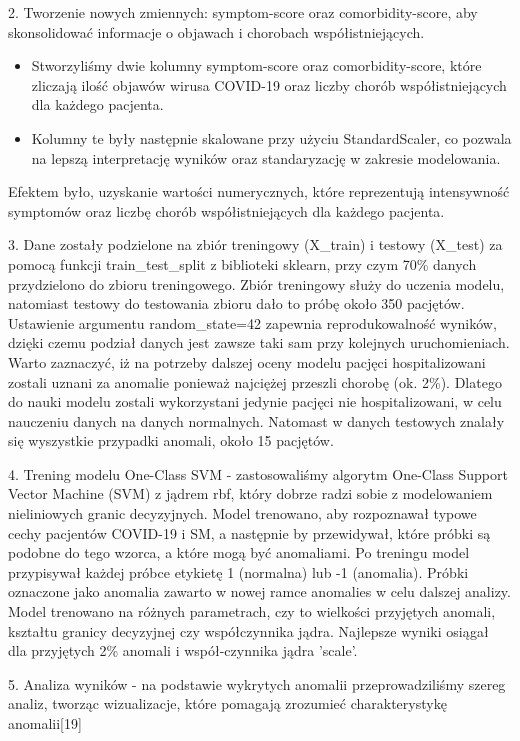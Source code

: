 \documentclass[a4paper,fleqn]{cas-dc}
\begin{document}
2. Tworzenie nowych zmiennych: symptom-score oraz comorbidity-score, aby skonsolidować informacje o objawach i chorobach współistniejących.
\begin{itemize} 
\item Stworzyliśmy dwie kolumny symptom-score oraz comorbidity-score, które zliczają ilość objawów wirusa COVID-19 oraz liczby chorób współistniejących dla każdego pacjenta.
\item  Kolumny te były następnie skalowane przy użyciu StandardScaler, co pozwala na lepszą interpretację wyników oraz standaryzację w zakresie modelowania.
\end{itemize}
Efektem było, uzyskanie wartości numerycznych, które reprezentują intensywność symptomów oraz liczbę chorób współistniejących dla każdego pacjenta.


3. Dane zostały podzielone na zbiór treningowy (X\_train) i testowy (X\_test) za pomocą funkcji train\_test\_split z biblioteki sklearn, przy czym 70\% danych przydzielono do zbioru treningowego. Zbiór treningowy służy do uczenia modelu, natomiast testowy do testowania zbioru dało to próbę około 350 pacjętów. Ustawienie argumentu random\_state=42 zapewnia reprodukowalność wyników, dzięki czemu podział danych jest zawsze taki sam przy kolejnych uruchomieniach. Warto zaznaczyć, iż na potrzeby dalszej oceny modelu pacjęci hospitalizowani zostali uznani za anomalie ponieważ najciężej przeszli chorobę (ok. 2\%). Dlatego do nauki modelu zostali wykorzystani jedynie pacjęci nie hospitalizowani, w celu nauczeniu danych na danych normalnych.  Natomast w danych testowych znalały się wyszystkie przypadki anomali, około 15 pacjętów.

4. Trening modelu One-Class SVM - zastosowaliśmy algorytm One-Class Support Vector Machine (SVM) z jądrem rbf, który dobrze radzi sobie z modelowaniem nieliniowych granic decyzyjnych. Model trenowano, aby rozpoznawał typowe cechy pacjentów COVID-19 i SM, a następnie by przewidywał, które próbki są podobne do tego wzorca, a które mogą być anomaliami. Po treningu model przypisywał każdej próbce etykietę 1 (normalna) lub -1 (anomalia). Próbki oznaczone jako anomalia zawarto w nowej ramce anomalies w celu dalszej analizy. Model trenowano na różnych parametrach, czy to wielkości przyjętych anomali, kształtu granicy decyzyjnej czy współczynnika jądra. Najlepsze wyniki osiągał dla przyjętych 2\% anomali i współ-czynnika jądra 'scale'.

5. Analiza wyników - na podstawie wykrytych anomalii przeprowadziliśmy szereg analiz, tworząc wizualizacje, które pomagają zrozumieć charakterystykę anomalii[19]
\end{document}
